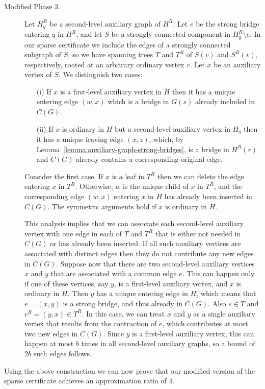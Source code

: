 \documentclass[11pt]{article}
\begin{document}
\begin{description}
\item[Modified Phase 3.]
Let $H_q^R$ be a second-level auxiliary graph of $H^R$.
Let $e$ be the strong bridge entering $q$ in $H^R$, and let $S$ be a strongly connected component in $H_q^R \setminus e$.
In our sparse certificate we include the edges of a strongly connected subgraph of $S$, so we have spanning trees $T$ and $T^R$ of $S(v)$ and $S^R(v)$, respectively, rooted at an arbitrary ordinary vertex $v$.
Let $x$ be an auxiliary vertex of $S$. We distinguish two cases:
\begin{itemize}
\item[(i)] If $x$ is a first-level auxiliary vertex in $H$ then it has a unique entering edge $(w,x)$ which is a bridge in $G(s)$ already included in $C(G)$.
\item[(ii)] If $x$ is ordinary in $H$ but a second-level auxiliary vertex in $H_q$ then it has a unique leaving edge $(x,z)$, which, by Lemma~\ref{lemma:auxiliary-graph-strong-bridges}, is a bridge in $H^R(r)$
and $C(G)$ already contains a corresponding original edge.
\end{itemize}
Consider the first case. If $x$ is a leaf in $T^R$ then we can delete the edge entering $x$ in $T^R$.
Otherwise, $w$ is the unique child of $x$ in $T^R$, and the corresponding edge $(w,x)$ entering $x$ in $H$ has already been inserted in $C(G)$.
The symmetric arguments hold if $x$ is ordinary in $H$.

This analysis implies that we can associate each second-level auxiliary vertex with one edge in each of $T$ and $T^R$ that is either not needed in $C(G)$ or has already been inserted.
If all such auxiliary vertices are associated with distinct edges then they do not contribute any new edges in $C(G)$.
Suppose now that there are two second-level auxiliary vertices $x$ and $y$ that are associated with a common edge $e$.
This can happen only if one of these vertices, say $y$, is a first-level auxiliary vertex, and $x$ is ordinary in $H$.
Then $y$ has a unique entering edge in $H$, which means that $e=(x,y)$ is a strong bridge, and thus already in $C(G)$.
Also $e \in T$ and $e^{R}=(y,x) \in T^R$.
In this case, we can treat $x$ and $y$ as a single auxiliary vertex that results from the contraction of $e$, which contributes at most two new edges in $C(G)$.
Since $y$ is a first-level auxiliary vertex, this can happen at most $b$ times in all second-level auxiliary graphs, so a bound of $2b$ such edges follows.
\end{description}

Using the above construction we can now prove that our modified version of the sparse certificate achieves an approximation ratio of $4$.
\end{document}
